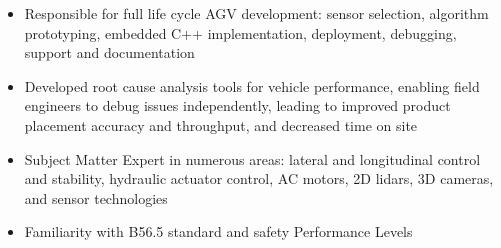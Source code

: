 	\begin{itemize} [leftmargin = \itemmargin]
				
		\item Responsible for full life cycle AGV development: sensor selection, algorithm prototyping, embedded C++ implementation, deployment, debugging, support and documentation
			
		\item Developed root cause analysis tools for vehicle performance, enabling field engineers to debug issues independently, leading to improved product placement accuracy and throughput, and decreased time on site

		\item Subject Matter Expert in numerous areas: lateral and longitudinal control and stability, hydraulic actuator control, AC motors, 2D lidars, 3D cameras, and sensor technologies
		
		\item Familiarity with B56.5 standard and safety Performance Levels

	\end{itemize} \\